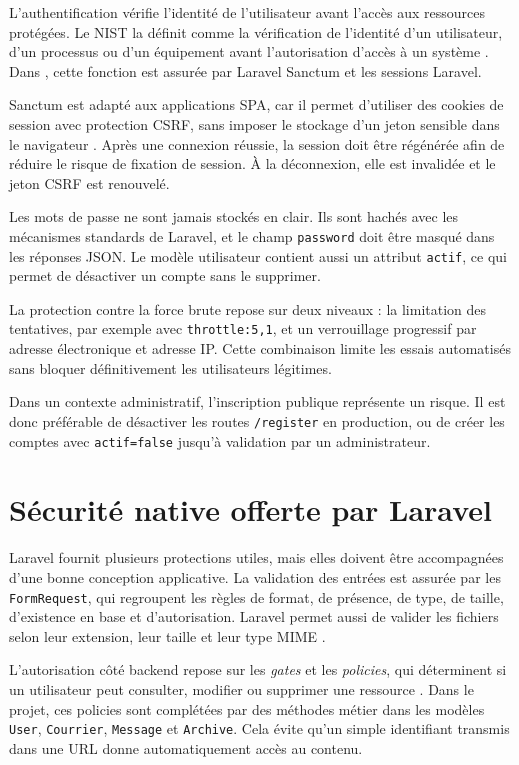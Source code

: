 L'authentification vérifie l'identité de l'utilisateur avant l'accès aux ressources protégées. Le NIST la définit comme la vérification de l'identité d'un utilisateur, d'un processus ou d'un équipement avant l'autorisation d'accès à un système \cite{nist-auth}. Dans \SecurityAppName{}, cette fonction est assurée par Laravel Sanctum et les sessions Laravel.

Sanctum est adapté aux applications SPA, car il permet d'utiliser des cookies de session avec protection CSRF, sans imposer le stockage d'un jeton sensible dans le navigateur \cite{laravel-sanctum}. Après une connexion réussie, la session doit être régénérée afin de réduire le risque de fixation de session. À la déconnexion, elle est invalidée et le jeton CSRF est renouvelé.

Les mots de passe ne sont jamais stockés en clair. Ils sont hachés avec les mécanismes standards de Laravel, et le champ \texttt{password} doit être masqué dans les réponses JSON. Le modèle utilisateur contient aussi un attribut \texttt{actif}, ce qui permet de désactiver un compte sans le supprimer.

La protection contre la force brute repose sur deux niveaux : la limitation des tentatives, par exemple avec \texttt{throttle:5,1}, et un verrouillage progressif par adresse électronique et adresse IP. Cette combinaison limite les essais automatisés sans bloquer définitivement les utilisateurs légitimes.

Dans un contexte administratif, l'inscription publique représente un risque. Il est donc préférable de désactiver les routes \texttt{/register} en production, ou de créer les comptes avec \texttt{actif=false} jusqu'à validation par un administrateur.

\section{Sécurité native offerte par Laravel}
\label{sec:securite-native-laravel}

Laravel fournit plusieurs protections utiles, mais elles doivent être accompagnées d'une bonne conception applicative. La validation des entrées est assurée par les \texttt{FormRequest}, qui regroupent les règles de format, de présence, de type, de taille, d'existence en base et d'autorisation. Laravel permet aussi de valider les fichiers selon leur extension, leur taille et leur type MIME \cite{laravel-validation}.

L'autorisation côté backend repose sur les \textit{gates} et les \textit{policies}, qui déterminent si un utilisateur peut consulter, modifier ou supprimer une ressource \cite{laravel-authorization}. Dans le projet, ces policies sont complétées par des méthodes métier dans les modèles \texttt{User}, \texttt{Courrier}, \texttt{Message} et \texttt{Archive}. Cela évite qu'un simple identifiant transmis dans une URL donne automatiquement accès au contenu.

